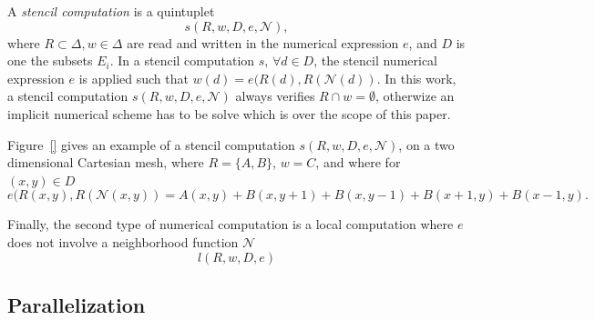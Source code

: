 A \textit{stencil computation} is a quintuplet
\begin{equation}
s(R,w,D,e,\mathcal{N}),
\end{equation}
where $R \subset \Delta, w \in \Delta$ are read and written in the numerical expression $e$, and $D$ is one the subsets $E_i$. In a stencil computation $s$, $\forall d \in D$, the stencil numerical expression $e$ is applied such that $w(d) = e(R(d),R(\mathcal{N}(d))$. In this work, a stencil computation $s(R,w,D,e,\mathcal{N})$ always verifies $R \cap w = \emptyset$, otherwize an implicit numerical scheme has to be solve which is over the scope of this paper.

Figure~\ref{} gives an example of a stencil computation $s(R,w,D,e,\mathcal{N})$, on a two dimensional Cartesian mesh, where $R=\{A,B\}$, $w=C$, and where for $(x,y) \in D$
\begin{equation*}
e(R(x,y),R(\mathcal{N}(x,y)) = A(x,y)+B(x,y+1)+B(x,y-1)+B(x+1,y)+B(x-1,y).
\end{equation*}

Finally, the second type of numerical computation is a local computation where $e$ does not involve a neighborhood function $\mathcal{N}$
\begin{equation}
l(R,w,D,e)
\end{equation}

\subsection{Parallelization}
\label{sect:parall}



